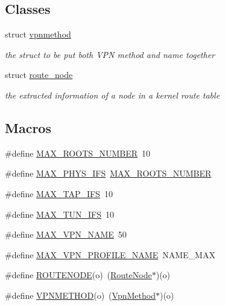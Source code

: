 \subsection*{Classes}
\begin{DoxyCompactItemize}
\item 
struct \hyperlink{structvpnmethod}{vpnmethod}
\begin{DoxyCompactList}\small\item\em the struct to be put both V\+PN method and name together \end{DoxyCompactList}\item 
struct \hyperlink{structroute__node}{route\+\_\+node}
\begin{DoxyCompactList}\small\item\em the extracted information of a node in a kernel route table \end{DoxyCompactList}\end{DoxyCompactItemize}
\subsection*{Macros}
\begin{DoxyCompactItemize}
\item 
\#define \hyperlink{route-tree_8h_a8e1da3af3417de420798c8b448b6a8cb}{M\+A\+X\+\_\+\+R\+O\+O\+T\+S\+\_\+\+N\+U\+M\+B\+ER}~10
\item 
\#define \hyperlink{route-tree_8h_a5f66955385e84e67789d731b5cad24c7}{M\+A\+X\+\_\+\+P\+H\+Y\+S\+\_\+\+I\+FS}~\hyperlink{route-tree_8h_a8e1da3af3417de420798c8b448b6a8cb}{M\+A\+X\+\_\+\+R\+O\+O\+T\+S\+\_\+\+N\+U\+M\+B\+ER}
\item 
\#define \hyperlink{route-tree_8h_a82e5e4b05dda947b534dc0941ad418ba}{M\+A\+X\+\_\+\+T\+A\+P\+\_\+\+I\+FS}~10
\item 
\#define \hyperlink{route-tree_8h_a0d314d64c79d675bd2614b20e738d527}{M\+A\+X\+\_\+\+T\+U\+N\+\_\+\+I\+FS}~10
\item 
\#define \hyperlink{route-tree_8h_a77ed9a5f9670b7a2d69c376d1199eddf}{M\+A\+X\+\_\+\+V\+P\+N\+\_\+\+N\+A\+ME}~50
\item 
\#define \hyperlink{route-tree_8h_ab6867a2365732ebd41ddf7459525d032}{M\+A\+X\+\_\+\+V\+P\+N\+\_\+\+P\+R\+O\+F\+I\+L\+E\+\_\+\+N\+A\+ME}~N\+A\+M\+E\+\_\+\+M\+AX
\item 
\#define \hyperlink{route-tree_8h_ab4431a377dee3e169cfe060fe7666758}{R\+O\+U\+T\+E\+N\+O\+DE}(o)~(\hyperlink{route-tree_8h_a1296be44c6672a1adb94ba6dc416682c}{Route\+Node}$\ast$)(o)
\item 
\#define \hyperlink{route-tree_8h_a58aa26c75d296ca73e2bca481e6e036f}{V\+P\+N\+M\+E\+T\+H\+OD}(o)~(\hyperlink{route-tree_8h_a1034dd038389279bf422489d4d99d43a}{Vpn\+Method}$\ast$)(o)
\end{DoxyCompactItemize}
